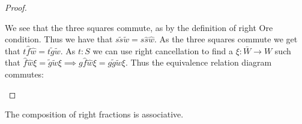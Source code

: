 \begin{proof}
\begin{center}
        \end{center}
        We see that the three squares commute, as by the definition of right Ore condition. Thus we have that $s\widetilde{s}\widetilde{w} = s\widehat{s}\widehat{w}$. As the three squares commute we get that $t\widehat{f}\widehat{w}=t\widetilde{g}\widetilde{w}$. As $t:S$ we can use right cancellation to find a $\xi:\bar{W}\rightarrow W$ such that $\widehat{f}\widehat{w}\xi = \widetilde{g}\widetilde{w}\xi \implies g\widehat{f}\widehat{w}\xi = g\widetilde{g}\widetilde{w}\xi$. Thus the equivalence relation diagram commutes:
        \begin{center}
        \end{center}
    \end{proof}

    \begin{prop}
        The composition of right fractions is associative.
    \end{prop}


